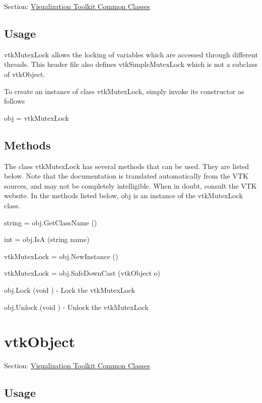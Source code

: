 Section\-: \hyperlink{sec_vtkcommon}{Visualization Toolkit Common Classes} \hypertarget{vtkwidgets_vtkxyplotwidget_Usage}{}\subsection{Usage}\label{vtkwidgets_vtkxyplotwidget_Usage}
vtk\-Mutex\-Lock allows the locking of variables which are accessed through different threads. This header file also defines vtk\-Simple\-Mutex\-Lock which is not a subclass of vtk\-Object.

To create an instance of class vtk\-Mutex\-Lock, simply invoke its constructor as follows \begin{DoxyVerb}  obj = vtkMutexLock
\end{DoxyVerb}
 \hypertarget{vtkwidgets_vtkxyplotwidget_Methods}{}\subsection{Methods}\label{vtkwidgets_vtkxyplotwidget_Methods}
The class vtk\-Mutex\-Lock has several methods that can be used. They are listed below. Note that the documentation is translated automatically from the V\-T\-K sources, and may not be completely intelligible. When in doubt, consult the V\-T\-K website. In the methods listed below, {\ttfamily obj} is an instance of the vtk\-Mutex\-Lock class. 
\begin{DoxyItemize}
\item {\ttfamily string = obj.\-Get\-Class\-Name ()}  
\item {\ttfamily int = obj.\-Is\-A (string name)}  
\item {\ttfamily vtk\-Mutex\-Lock = obj.\-New\-Instance ()}  
\item {\ttfamily vtk\-Mutex\-Lock = obj.\-Safe\-Down\-Cast (vtk\-Object o)}  
\item {\ttfamily obj.\-Lock (void )} -\/ Lock the vtk\-Mutex\-Lock  
\item {\ttfamily obj.\-Unlock (void )} -\/ Unlock the vtk\-Mutex\-Lock  
\end{DoxyItemize}\hypertarget{vtkcommon_vtkobject}{}\section{vtk\-Object}\label{vtkcommon_vtkobject}
Section\-: \hyperlink{sec_vtkcommon}{Visualization Toolkit Common Classes} \hypertarget{vtkwidgets_vtkxyplotwidget_Usage}{}\subsection{Usage}\label{vtkwidgets_vtkxyplotwidget_Usage}
